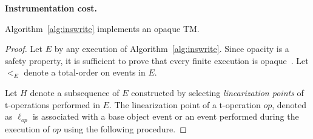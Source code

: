 \vspace{1mm}\noindent\textbf{Instrumentation cost.}
%
\begin{lemma}
\label{lm:opacityh1}
Algorithm~\ref{alg:inswrite} implements an opaque TM.
\end{lemma}
%
\begin{proof}
%
Let $E$ by any execution of Algorithm~\ref{alg:inswrite}. 
Since opacity is a safety property, it is sufficient to prove that every finite execution is opaque~\cite{icdcs-opacity}.
Let $<_E$ denote a total-order on events in $E$.

Let $H$ denote a subsequence of $E$ constructed by selecting
\emph{linearization points} of t-operations performed in $E$.
The linearization point of a t-operation $op$, denoted as $\ell_{op}$ is associated with  
a base object event or an event performed during 
the execution of $op$ using the following procedure. 


\end{proof}
